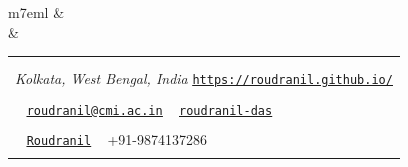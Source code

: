 \documentclass[11pt]{extarticle}
\makeatletter
\newcommand*{\mapsymbol}{%
    \BeginAccSupp{method=hex,unicode,ActualText=Location:}%
        \faMapMarker*%
    \EndAccSupp{}
}%
\newcommand*{\linkedinsymbol}{%
\protect\BeginAccSupp{ActualText=LinkedIn:}%
{{\faLinkedin}~}%
\protect\EndAccSupp{}}%
\newcommand*{\phonesymbol}{%
\protect\BeginAccSupp{ActualText=Telephone:}%
{{\faPhone}~}%
\protect\EndAccSupp{}}%
\newcommand*{\emailsymbol}{%
\protect\BeginAccSupp{ActualText=Email:}%
{{\faEnvelope}~}%
\protect\EndAccSupp{}}%
\newcommand*{\githubsymbol}{%
\protect\BeginAccSupp{ActualText=GitHub:}%
{{\faGithub}~}%
\protect\EndAccSupp{}}%
\newcommand*{\websitesymbol}{%
\protect\BeginAccSupp{ActualText=Personal Website:}%
{{\faGlobe}}%
\protect\EndAccSupp{}}%
\newcommand{\link}[2]{
    \BeginAccSupp{method = pdfstringdef, ActualText = {\protect\unichar{"000A}#2\protect\unichar{"000A}}}
        \href{#2}{\texttt{\ul{#1}}}
    \EndAccSupp{}
}
\newcommand{\mail}{
    \BeginAccSupp{method = pdfstringdef, ActualText = {\protect\unichar{"000A}roudranil@cmi.ac.in\protect\unichar{"000A}}}
        \href{mailto:roudranil@cmi.ac.in}{\texttt{\ul{roudranil@cmi.ac.in}}}
    \EndAccSupp{}
}
\newcommand{\sechead}[1]{
   \BeginAccSupp{method=escape, ActualText=#1}
      {\LARGE{\color{deepblue}{\textsc{#1}}}}
   \EndAccSupp{}
}
\makeatother
\begin{document}
   \vspace*{-0.5em}

    \begin{tabular}[H]{m{7em}l}
        & \\[-2ex]
         &
        \begin{tabular}{@{}l@{}}
            \BeginAccSupp{method=escape, ActualText=Name: Roudranil Das}\textcolor{deepred}{\HUGE{\color{deepblue}{\textsc{Roudranil Das}}}}\EndAccSupp{}\\\vspace{-0.1em}\\
            \mapsymbol\;\textit{Kolkata, West Bengal, India}\quad\;\websitesymbol\link{https://roudranil.github.io/}{https://roudranil.github.io/}\\\vspace{-0.6em}\\
            \emailsymbol\mail\quad\;\linkedinsymbol\link{roudranil-das}{https://www.linkedin.com/in/roudranil-das/}\quad\;\\\vspace{-0.6em}\\
            \githubsymbol\link{Roudranil}{https://github.com/Roudranil}\quad\;\phonesymbol+91-9874137286\\\vspace{-0.6em}
        \end{tabular}
    \end{tabular}\\




\end{document}
